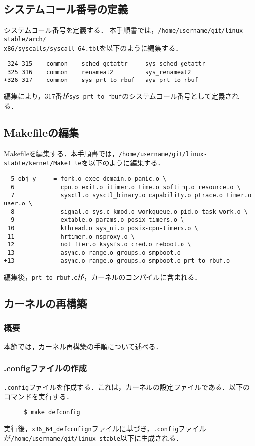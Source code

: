 \documentclass[12pt]{jsarticle}
\begin{document}
\subsection{システムコール番号の定義}
システムコール番号を定義する．
本手順書では，\verb|/home/username/git/linux-stable/arch/|\\
\verb|x86/syscalls/syscall_64.tbl|を以下のように編集する．

\begin{verbatim}
 324 315    common    sched_getattr     sys_sched_getattr
 325 316    common    renameat2	        sys_renameat2
+326 317    common    sys_prt_to_rbuf   sys_prt_to_rbuf
\end{verbatim}
編集により，$317$番が\verb|sys_prt_to_rbuf|のシステムコール番号として定義される．
\subsection{Makefileの編集}
Makefileを編集する．本手順書では，\verb|/home/username/git/linux-stable/kernel/Makefile|を以下のように編集する．
\begin{verbatim}
  5 obj-y     = fork.o exec_domain.o panic.o \
  6             cpu.o exit.o itimer.o time.o softirq.o resource.o \
  7             sysctl.o sysctl_binary.o capability.o ptrace.o timer.o user.o \
  8             signal.o sys.o kmod.o workqueue.o pid.o task_work.o \
  9             extable.o params.o posix-timers.o \
 10             kthread.o sys_ni.o posix-cpu-timers.o \
 11             hrtimer.o nsproxy.o \
 12             notifier.o ksysfs.o cred.o reboot.o \
-13             async.o range.o groups.o smpboot.o
+13             async.o range.o groups.o smpboot.o prt_to_rbuf.o
\end{verbatim}
編集後，\verb|prt_to_rbuf.c|が，カーネルのコンパイルに含まれる．
\subsection{カーネルの再構築}

\subsubsection{概要}
本節では，カーネル再構築の手順について述べる．
\subsubsection{.configファイルの作成}
\verb|.config|ファイルを作成する．これは，カーネルの設定ファイルである．以下のコマンドを実行する．
\begin{description}
\item[] \verb|$ make defconfig|
\end{description}
実行後，\verb|x86_64_defconfign|ファイルに基づき，\verb|.config|ファイルが\verb|/home/username/git/linux-stable|以下に生成される．
\end{document}
